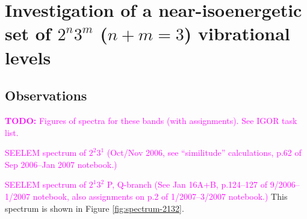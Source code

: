 \documentclass[12pt,draft]{mitthesis}
\newcommand{\TODO} [1]{\textcolor{magenta}{\textbf{TODO:} #1}}
\newcommand{\POINT}[1]{\textcolor{magenta}{#1}}
\begin{document}










\section{Investigation of a near-isoenergetic set of $2^n3^m$ ($n+m=3$)
  vibrational levels}

\subsection{Observations}

\TODO{Figures of spectra for these bands (with assignments). See IGOR
  task list.}

\POINT{SEELEM spectrum of $2^2 3^1$ (Oct/Nov 2006, see ``similitude''
  calculations, p.62 of Sep 2006--Jan 2007 notebook.)}



\POINT{SEELEM spectrum of $2^1 3^2$ P, Q-branch (See Jan 16A+B,
  p.124--127 of 9/2006--1/2007 notebook, also assignments on p.2 of
  1/2007--3/2007 notebook.)}  This spectrum is shown in Figure
\ref{fig:spectrum-2132}.
\end{document}
